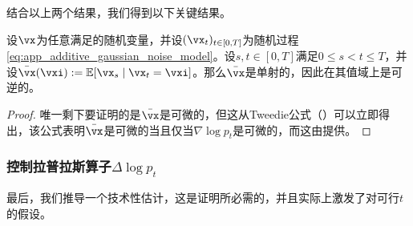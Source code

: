 \documentclass[../../book-main.tex]{subfiles}
\begin{document}
结合以上两个结果，我们得到以下关键结果。

\begin{corollary}\label{cor:gribonval_A2}
    设\(\vx\)为任意满足的随机变量，并设\((\vx_{t})_{t \in [0, T]}\)为随机过程\eqref{eq:app_additive_gaussian_noise_model}。设\(s, t \in [0, T]\)满足\(0 \leq s < t \leq T\)，并设\(\bar{\vx}(\vxi) := \Ex[\vx_{s} \mid \vx_{t} = \vxi]\)。那么\(\bar{\vx}\)是单射的，因此在其值域上是可逆的。
\end{corollary}
\begin{proof}
    唯一剩下要证明的是\(\bar{\vx}\)是可微的，但这从Tweedie公式（）可以立即得出，该公式表明\(\bar{\vx}\)是可微的当且仅当\(\nabla \log p_{t}\)是可微的，而这由提供。
\end{proof}

\subsubsection{控制拉普拉斯算子\(\Delta \log p_{t}\)}

最后，我们推导一个技术性估计，这是证明所必需的，并且实际上激发了对可行\(t\)的假设。
\end{document}
